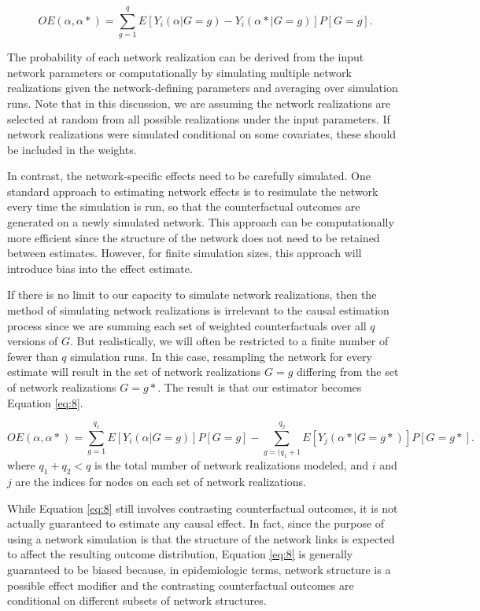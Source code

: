 \documentclass{article}
\theoremstyle{definition}
\begin{document}
\begin{equation}\label{eq:7}
   OE\left(\alpha,\alpha* \right) = \sum_{g=1}^qE\left[Y_{i}\left(\alpha|G=g\right) - Y_{i}\left(\alpha*|G=g\right)\right]P\left[G=g\right].	
\end{equation}

The probability of each network realization can be derived from the input network parameters or computationally by simulating multiple network realizations given the network-defining parameters and averaging over simulation runs. Note that in this discussion, we are assuming the network realizations are selected at random from all possible realizations under the input parameters. If network realizations were simulated conditional on some covariates, these should be included in the weights.

In contrast, the network-specific effects need to be carefully simulated. One standard approach to estimating network effects is to resimulate the network every time the simulation is run, so that the counterfactual outcomes are generated on a newly simulated network.  This approach can be computationally more efficient since the structure of the network does not need to be retained between estimates. However, for finite simulation sizes, this approach will introduce bias into the effect estimate. 

If there is no limit to our capacity to simulate network realizations, then the method of simulating network realizations is irrelevant to the causal estimation process since we are summing each set of weighted counterfactuals over all $q$ versions of $G$. But realistically, we will often be restricted to a finite number of fewer than $q$ simulation runs. In this case, resampling the network for every estimate will result in the set of network realizations $G=g$ differing from the set of network realizations $G=g*$. The result is that our estimator becomes Equation \ref{eq:8}.

\begin{equation}\label{eq:8}
   OE\left(\alpha,\alpha* \right) = \sum_{g=1}^{q_1}E\left[Y_{i}\left(\alpha|G=g\right)\right]P\left[G=g\right]- \sum_{g=(q_1 +1}^{q_2}E\left[Y_{j}\left(\alpha*|G=g*\right)\right]P\left[G=g*\right].	
\end{equation}
where $q_1+q_2 < q$ is the total number of network realizations modeled, and $i$ and $j$ are the indices for nodes on each set of network realizations.

While Equation \ref{eq:8} still involves contrasting counterfactual outcomes, it is not actually guaranteed to estimate any causal effect. In fact, since the purpose of using a network simulation is that the structure of the network links is expected to affect the resulting outcome distribution, Equation \ref{eq:8} is generally guaranteed to be biased because, in epidemiologic terms, network structure is a possible effect modifier \cite{buchanan_spillover_2022} and the contrasting counterfactual outcomes are conditional on different subsets of network structures.
\end{document}
